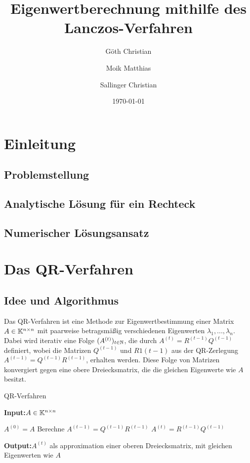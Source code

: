 \documentclass{article}
\begin{document}
\title
{
	Eigenwertberechnung mithilfe des Lanczos-Verfahren
}
\author
{
	Göth Christian
	\and
	Moik Matthias
	\and
	Sallinger Christian
}
\date{\today}
\maketitle

\newpage
\tableofcontents
\newpage


\section{Einleitung}

\subsection{Problemstellung}
\subsection{Analytische Lösung für ein Rechteck}
\subsection{Numerischer Lösungsansatz}

\section{Das QR-Verfahren}

\subsection{Idee und Algorithmus}

Das QR-Verfahren ist eine Methode zur Eigenwertbestimmung einer Matrix $A \in \mathbb{K}^{n \times n}$ mit paarweise betragsmäßig verschiedenen Eigenwerten $\lambda_1, ..., \lambda_n$. Dabei wird iterativ eine Folge $(A^{(t)})_{t \in \mathbb{N}}$, die durch $A^{(t)} = R^{(t-1)}Q^{(t-1)}$ definiert, wobei die Matrizen $Q^{(t-1)}$ und $R1{(t-1)}$ aus der QR-Zerlegung $A^{(t-1)} = Q^{(t-1)}R^{(t-1)}$, erhalten werden. Diese Folge von Matrizen konvergiert gegen eine obere Dreiecksmatrix, die die gleichen Eigenwerte wie $A$ besitzt.

\renewcommand{\algorithmicrequire}{\textbf{Input:}}
\renewcommand{\algorithmicensure}{\textbf{Output:}}

\begin{algorithm}
	\label{QR-Verfahren}
	\caption{QR-Verfahren}
	\algorithmicrequire{$A \in \mathbb{K}^{n\times n}$}
	\begin{algorithmic}[1]
		\State $A^{(0)} = A$
		\State Berechne $A^{(t-1)} = Q^{(t-1)}R^{(t-1)}$
		\State $A^{(t)} = R^{(t-1)}Q^{(t-1)}$
		\EndWhile
	\end{algorithmic}
	\algorithmicensure{$A^{(t)}$ als approximation einer oberen Dreiecksmatrix, mit gleichen Eigenwerten wie $A$}
\end{algorithm}
\end{document}
